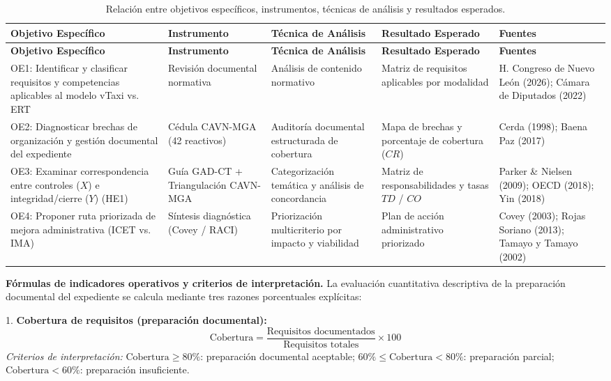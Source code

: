 {\begin{center}
\begingroup\fontsize{8.5}{10.5}\selectfont
\renewcommand{\arraystretch}{1.25}
\setlength{\tabcolsep}{3pt}
\begin{longtable}{@{}p{2.9cm}p{2.2cm}p{2.5cm}p{2.9cm}p{2.9cm}@{}}
\caption{Relación entre objetivos específicos, instrumentos, técnicas de análisis y resultados esperados.}\\
\toprule
\textbf{Objetivo Específico} & \textbf{Instrumento} & \textbf{Técnica de Análisis} & \textbf{Resultado Esperado} & \textbf{Fuentes} \\
\midrule
\endfirsthead
\toprule
\textbf{Objetivo Específico} & \textbf{Instrumento} & \textbf{Técnica de Análisis} & \textbf{Resultado Esperado} & \textbf{Fuentes} \\
\midrule
\endhead
OE1: Identificar y clasificar requisitos y competencias aplicables al modelo vTaxi vs. ERT & Revisión documental normativa & Análisis de contenido normativo & Matriz de requisitos aplicables por modalidad & H. Congreso de Nuevo León (2026); Cámara de Diputados (2022) \\
\midrule
OE2: Diagnosticar brechas de organización y gestión documental del expediente & Cédula CAVN-MGA (42 reactivos) & Auditoría documental estructurada de cobertura & Mapa de brechas y porcentaje de cobertura ($CR$) & Cerda (1998); Baena Paz (2017) \\
\midrule
OE3: Examinar correspondencia entre controles ($X$) e integridad/cierre ($Y$) (HE1) & Guía GAD-CT + Triangulación CAVN-MGA & Categorización temática y análisis de concordancia & Matriz de responsabilidades y tasas $TD$ / $CO$ & Parker \& Nielsen (2009); OECD (2018); Yin (2018) \\
\midrule
OE4: Proponer ruta priorizada de mejora administrativa (ICET vs. IMA) & Síntesis diagnóstica (Covey / RACI) & Priorización multicriterio por impacto y viabilidad & Plan de acción administrativo priorizado & Covey (2003); Rojas Soriano (2013); Tamayo y Tamayo (2002) \\
\bottomrule
\end{longtable}
\endgroup
\end{center}

\textbf{Fórmulas de indicadores operativos y criterios de interpretación.} La evaluación cuantitativa descriptiva de la preparación documental del expediente se calcula mediante tres razones porcentuales explícitas:

1. \textbf{Cobertura de requisitos (preparación documental):}
$$\text{Cobertura} = \frac{\text{Requisitos documentados}}{\text{Requisitos totales}} \times 100$$
\textit{Criterios de interpretación:} $\text{Cobertura} \ge 80\%$: preparación documental aceptable; $60\% \le \text{Cobertura} < 80\%$: preparación parcial; $\text{Cobertura} < 60\%$: preparación insuficiente.

}
